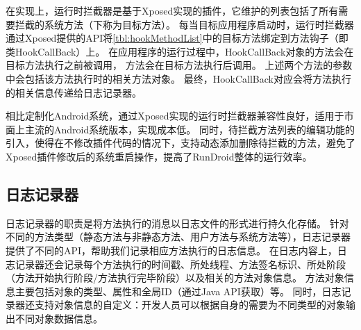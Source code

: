 

在实现上，运行时拦截器是基于Xposed\cite{Xposed}实现的插件，它维护的列表包括了所有需要拦截的系统方法（下称为目标方法）。%
每当目标应用程序启动时，运行时拦截器通过Xposed提供的API将\autoref{tbl:hookMethodList}中的目标方法绑定到方法钩子（即类HookCallBack）上。
在应用程序的运行过程中，HookCallBack对象的方法会在目标方法执行之前被调用，
方法会在目标方法执行后调用。
上述两个方法的参数中会包括该方法执行时的相关方法对象。
最终，HookCallBack对应会将方法执行的相关信息传递给日志记录器。



相比定制化Android系统，通过Xposed实现的运行时拦截器兼容性良好，适用于市面上主流的Android系统版本，实现成本低。
同时，待拦截方法列表的编辑功能的引入，使得在不修改插件代码的情况下，支持动态添加删除待拦截的方法，避免了Xposed插件修改后的系统重启操作，提高了RunDroid整体的运行效率。
 

\subsection{日志记录器}

日志记录器的职责是将方法执行的消息以日志文件的形式进行持久化存储。
针对不同的方法类型（静态方法与非静态方法、用户方法与系统方法等），日志记录器提供了不同的API，帮助我们记录相应方法执行的日志信息。
在日志内容上，日志记录器还会记录每个方法执行的时间戳、所处线程、方法签名标识、所处阶段（方法开始执行阶段/方法执行完毕阶段）以及相关的方法对象信息。
方法对象信息主要包括对象的类型、属性和全局ID（通过Java API获取）等。
同时，日志记录器还支持对象信息的自定义：开发人员可以根据自身的需要为不同类型的对象输出不同对象数据信息。




